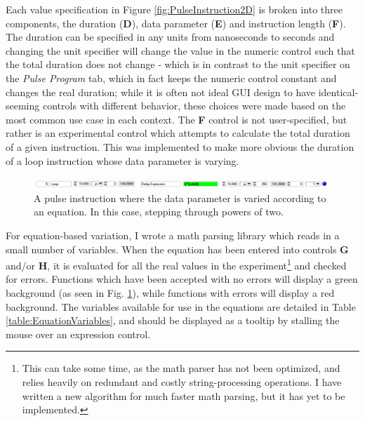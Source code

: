 \documentclass[PaulGanssle-Thesis.tex]{subfiles}
\begin{document}
Each value specification in Figure \ref{fig:PulseInstruction2D} is broken into three components, the duration (\textbf{D}), data parameter (\textbf{E}) and instruction length (\textbf{F}). The duration can be specified in any units from nanoseconds to seconds and changing the unit specifier will change the value in the numeric control such that the total duration does not change - which is in contrast to the unit specifier on the \textit{Pulse Program} tab, which in fact keeps the numeric control constant and changes the real duration; while it is often not ideal GUI design to have identical-seeming controls with different behavior, these choices were made based on the most common use case in each context. The \textbf{F} control is not user-specified, but rather is an experimental control which attempts to calculate the total duration of a given instruction. This was implemented to make more obvious the duration of a loop instruction whose data parameter is varying.

\begin{figure}[!h]
\includegraphics[width=\tw]{figures/console/expression_mode_data_expr.png}
\caption{A pulse instruction where the data parameter is varied according to an equation. In this case, stepping through powers of two.}
\label{fig:EquationAcceptedDataMode}
\end{figure}

For equation-based variation, I wrote a math parsing library which reads in a small number of variables. When the equation has been entered into controls \textbf{G} and/or \textbf{H}, it is evaluated for all the real values in the experiment\footnote{This can take some time, as the math parser has not been optimized, and relies heavily on redundant and costly string-processing operations. I have written a new algorithm for much faster math parsing, but it has yet to be implemented.} and checked for errors. Functions which have been accepted with no errors will display a green background (as seen in Fig. \ref{fig:EquationAcceptedDataMode}), while functions with errors will display a red background. The variables available for use in the equations are detailed in Table \ref{table:EquationVariables}, and should be displayed as a tooltip by stalling the mouse over an expression control.
\end{document}
